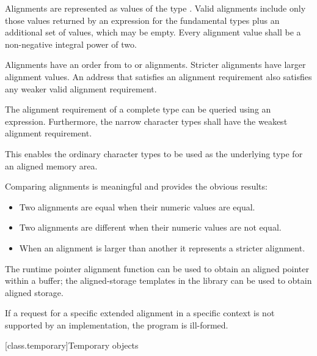 \pnum
Alignments are represented as values of the type .
Valid alignments include only those values returned by an 
expression for the fundamental types plus an additional 
set of values, which may be empty.
Every alignment value shall be a non-negative integral power of two.

\pnum
Alignments have an order from  to
 or  alignments. Stricter
alignments have larger alignment values. An address that satisfies an alignment
requirement also satisfies any weaker valid alignment requirement.

\pnum
The alignment requirement of a complete type can be queried using an
 expression. Furthermore,
the narrow character types shall have the weakest
alignment requirement.
\begin{note}
This enables the ordinary character types to be used as the
underlying type for an aligned memory area.
\end{note}

\pnum
Comparing alignments is meaningful and provides the obvious results:
\begin{itemize}
\item Two alignments are equal when their numeric values are equal.
\item Two alignments are different when their numeric values are not equal.
\item When an alignment is larger than another it represents a stricter alignment.
\end{itemize}

\pnum
\begin{note}
The runtime pointer alignment function
can be used to obtain an aligned pointer within a buffer; the aligned-storage templates
in the library can be used to obtain aligned storage.
\end{note}

\pnum
If a request for a specific extended alignment in a specific context is not
supported by an implementation, the program is ill-formed.

[class.temporary]{Temporary objects}

